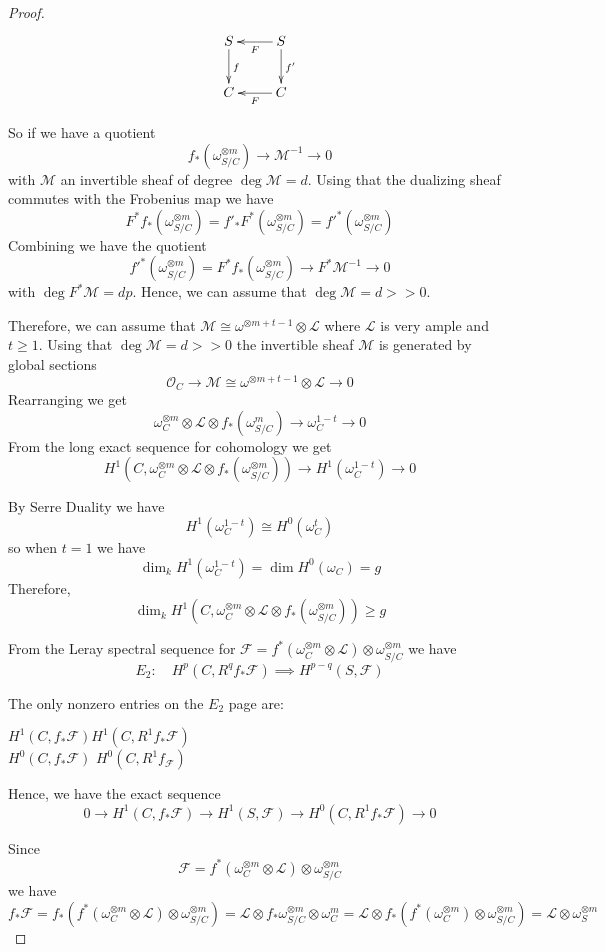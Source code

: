 \begin{proof}
$$
\xymatrix{
S \ar[d]^f  &S \ar[d]^{f'} \ar[l]^{F} \\
C   &C \ar[l]^{F} 
}
$$

So if we have a quotient $$f_*(\omega^{\otimes m}_{S/C})\to \mathcal{M}^{-1}\to 0$$ with $\mathcal{M}$ an invertible sheaf of degree $\deg \mathcal{M}=d$. Using that the dualizing sheaf commutes with the Frobenius map we have $$F^*f_*(\omega^{\otimes m}_{S/C})=f'_*F^*(\omega^{\otimes m}_{S/C})=f'^*(\omega^{\otimes m}_{S/C})$$ Combining we have the quotient $$f'^*(\omega^{\otimes m}_{S/C})=F^*f_*(\omega^{\otimes m}_{S/C})\to F^*\mathcal{M}^{-1}\to 0$$ with $\deg F^*\mathcal{M}=dp$. Hence, we can assume that $\deg \mathcal{M}=d>>0$. 

Therefore, we can assume that $\mathcal{M}\cong \omega^{\otimes m+t-1}\otimes \mathcal{L}$ where $\mathcal{L}$ is very ample and $t\geq 1$. Using that $\deg \mathcal{M}=d>>0$ the invertible sheaf $\mathcal{M}$ is generated by global sections $$\mathcal{O}_{C}\to \mathcal{M}\cong \omega^{\otimes m+t-1}\otimes \mathcal{L}\to 0$$ Rearranging we get $$\omega_C^{\otimes m}\otimes \mathcal{L} \otimes f_*(\omega^m_{S/C})\to \omega_C^{1-t}\to 0$$ From the long exact sequence for cohomology we get $$H^1(C, \omega^{\otimes m}_C\otimes \mathcal{L}\otimes f_*(\omega^{\otimes m}_{S/C}))\to H^1(\omega_C^{1-t})\to 0$$

By Serre Duality we have $$H^1(\omega_C^{1-t})\cong H^0(\omega_C^t)$$ so when $t=1$ we have $$\dim_k H^1(\omega_C^{1-t})=\dim H^0(\omega_C)=g$$ Therefore, $$\dim_k H^1(C, \omega^{\otimes m}_C\otimes \mathcal{L}\otimes f_*(\omega^{\otimes m}_{S/C}))\geq g$$

From the Leray spectral sequence for $\mathcal{F}=f^*(\omega^{\otimes m}_C\otimes \mathcal{L})\otimes \omega^{\otimes m}_{S/C}$ we have $$E_2: \quad H^p(C, R^qf_*\mathcal{F})\implies H^{p-q}(S,\mathcal{F})$$

The only nonzero entries on the $E_2$ page are: 
\begin{center}
$H^1(C, f_*\mathcal{F})$\quad  \quad $H^1(C, R^1f_*\mathcal{F})$\\
$H^0(C, f_*\mathcal{F})$ \quad \quad $H^0(C,R^1f_\mathcal{F})$
\end{center}

Hence, we have the exact sequence $$0\to H^1(C, f_*\mathcal{F})\to H^1(S, \mathcal{F})\to H^0(C, R^1f_*\mathcal{F})\to 0$$

Since $$\mathcal{F}=f^*(\omega^{\otimes m}_C\otimes \mathcal{L})\otimes \omega^{\otimes m}_{S/C}$$ we have $$f_*\mathcal{F}=f_*(f^*(\omega^{\otimes m}_C\otimes \mathcal{L})\otimes \omega^{\otimes m}_{S/C})=\mathcal{L}\otimes f_*\omega^{\otimes m}_{S/C}\otimes \omega^m_C=\mathcal{L}\otimes f_*(f^*(\omega^{\otimes m}_C)\otimes \omega^{\otimes m}_{S/C})=\mathcal{L}\otimes \omega^{\otimes m}_S$$


\end{proof}
